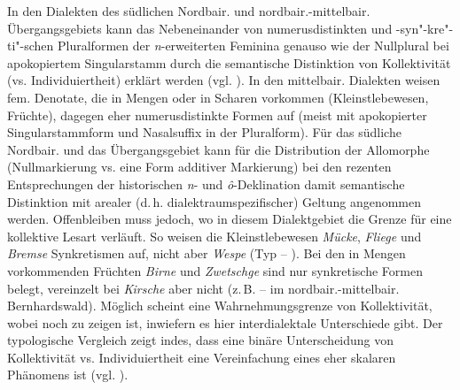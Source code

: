 In den Dialekten des südlichen Nordbair. und  nordbair.-mittelbair. Übergangsgebiets kann das Nebeneinander von numerusdistinkten und -syn"-kre"-ti"-schen Pluralformen der \textit{n}{}-erweiterten Feminina genauso wie der Nullplural bei apokopiertem Singularstamm durch die semantische Distinktion von Kollektivität (vs. Individuiertheit) erklärt werden (vgl. \citealt[190]{Rowley1997}). In den mittelbair. Dialekten weisen fem. Denotate, die in Mengen oder in Scharen vorkommen (Kleinstlebewesen, Früchte), dagegen eher numerusdistinkte Formen auf (meist mit apokopierter Singularstammform und Nasalsuffix in der Pluralform). Für das südliche Nordbair. und das Übergangsgebiet kann für die Distribution der Allomorphe (Nullmarkierung vs. eine Form additiver Markierung) bei den rezenten Entsprechungen der historischen \textit{n}{}- und \textit{ô}{}-Deklination damit semantische Distinktion mit arealer (d.\,h. dialektraumspezifischer) Geltung angenommen werden. Offenbleiben muss jedoch, wo in diesem Dialektgebiet die Grenze für eine kollektive Lesart verläuft. So weisen die Kleinstlebewesen \textit{Mücke}, \textit{Fliege} und \textit{Bremse} Synkretismen auf, nicht aber \textit{Wespe} (Typ  -- ). Bei den in Mengen vorkommenden Früchten \textit{Birne} und \textit{Zwetschge} sind nur synkretische Formen belegt, vereinzelt bei \textit{Kirsche} aber nicht (z.\,B.  --  im nordbair.-mittelbair. Bernhardswald). Möglich scheint eine Wahrnehmungsgrenze von Kollektivität, wobei noch zu zeigen ist, inwiefern es hier interdialektale Unterschiede gibt. Der typologische Vergleich zeigt indes, dass eine binäre Unterscheidung von Kollektivität vs. Individuiertheit eine Vereinfachung eines eher skalaren Phänomens ist (vgl. \citealt[82]{Corbett2000}).

